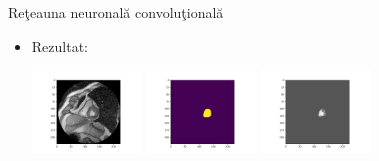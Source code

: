 \documentclass[xcolor=svgnames,handout]{beamer}
\begin{document}
  \begin{frame}
    {Re\c{t}eauna neuronal\u{a} convolu\c{t}ional\u{a}}
  \begin{itemize}
    \item Rezultat:
       
    \begin{center}
        \includegraphics[width=110]{1_image.png}
        \includegraphics[width=110]{1_labels.png}
        \includegraphics[width=110]{1_image_labels.png}

\end{center}
\end{itemize}
\end{frame}
\end{document}
